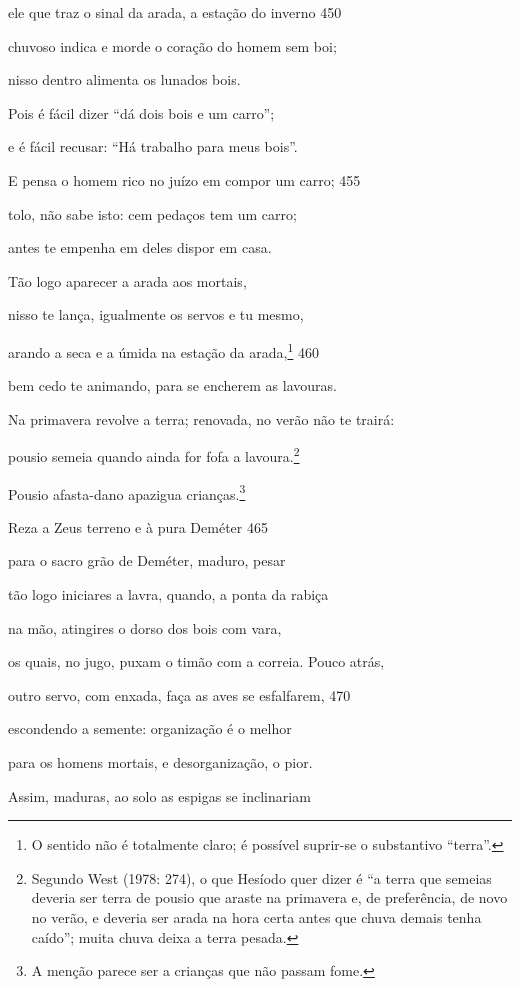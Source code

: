 ele que traz o sinal da arada, a estação do inverno \num{450}

chuvoso indica e morde o coração do homem sem boi;

nisso dentro alimenta os lunados bois.

Pois é fácil dizer ``dá dois bois e um carro'';

e é fácil recusar: ``Há trabalho para meus bois''.

E pensa o homem rico no juízo em compor um carro; \num{455}

tolo, não sabe isto: cem pedaços tem um carro;

antes te empenha em deles dispor em casa.

Tão logo aparecer a arada aos mortais,

nisso te lança, igualmente os servos e tu mesmo,

arando a seca e a úmida na estação da arada,\footnote{O sentido não é totalmente claro; é possível suprir-se o substantivo ``terra''.} \num{460}

bem cedo te animando, para se encherem as lavouras.

Na primavera revolve a terra; renovada, no verão não te \qb{}trairá:

pousio semeia quando ainda for fofa a lavoura.\footnote{Segundo West (1978: 274), o que Hesíodo quer dizer é ``a terra
que semeias deveria ser terra de pousio que araste na primavera e, de
preferência, de novo no verão, e deveria ser arada na hora certa antes
que chuva demais tenha caído''; muita chuva deixa a terra pesada.}

Pousio afasta-dano apazigua crianças.\footnote{A menção parece ser a crianças que não passam fome.}

Reza a Zeus terreno e à pura Deméter \num{465}

para o sacro grão de Deméter, maduro, pesar

tão logo iniciares a lavra, quando, a ponta da rabiça

na mão, atingires o dorso dos bois com vara,

os quais, no jugo, puxam o timão com a correia. Pouco atrás,

outro servo, com enxada, faça as aves se esfalfarem, \num{470}

escondendo a semente: organização é o melhor

para os homens mortais, e desorganização, o pior.

Assim, maduras, ao solo as espigas se inclinariam


